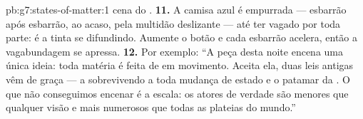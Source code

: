 \begin{solution}{pb:g7:states-of-matter:1}
cena do .
\textbf{11.} A camisa azul é empurrada --- esbarrão após esbarrão, ao
acaso, pela multidão deslizante --- até ter vagado por toda parte: é
a tinta se difundindo. Aumente o botão e cada esbarrão acelera, então
a vagabundagem se apressa.
\textbf{12.} Por exemplo: ``A peça desta noite encena uma única
ideia: toda matéria é feita de  em movimento. Aceita ela,
duas leis antigas vêm de graça --- a  sobrevivendo a toda
mudança de estado e o patamar da . O que não conseguimos encenar
é a escala: os atores de verdade são menores que qualquer visão e
mais numerosos que todas as plateias do mundo.''
\end{solution}
